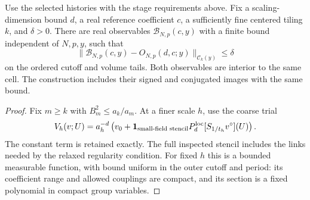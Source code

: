 \begin{proposition}
\label{ch13:bounded-singleton}
Use the selected histories with the stage requirements above. Fix a scaling-dimension bound $d$, a real reference coefficient $c$, a
sufficiently fine centered tiling $k$, and $\delta>0$. There are real
observables $\mathcal B_{N,p}(c,y)$ with a finite bound independent of
$N,p,y$, such that
\[
 \|\mathcal B_{N,p}(c,y)-O_{N,p}(d,c;y)\|_{\mathcal C_k(y)}\le\delta
\]
on the ordered cutoff and volume tails. Both observables are interior
to the same cell. The construction includes their signed and conjugated
images with the same bound.
\end{proposition}
\begin{proof}
Fix $m\ge k$ with $B_m^2\le a_k/a_m$. At a finer scale $h$, use the
coarse trial
\[
 V_h(v;U)=a_h^{-d}\left(v_0+
       \mathbf1_{\text{small-field stencil}}
                    P_d^{\rm loc}[S_{1/t_h}v^\circ](U)\right).
\]
The constant term is retained exactly. The full inspected stencil includes
the links needed by the relaxed regularity condition. For fixed $h$ this is
a bounded measurable function, with bound uniform in the outer cutoff
and period: its coefficient range and allowed couplings are compact,
and its section is a fixed polynomial in compact group variables.


\end{proof}
